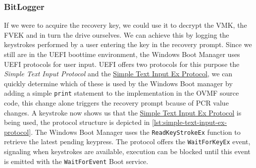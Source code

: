 \subsubsection{BitLogger}

If we were to acquire the recovery key, we could use it to decrypt the \ac{VMK}, the \ac{FVEK} and in turn the drive ourselves.
We can achieve this by logging the keystrokes performed by a user entering the key in the recovery prompt.
Since we still are in the \ac{UEFI} boottime environment, the Windows Boot Manager uses \ac{UEFI} protocols for user input.
\ac{UEFI} offers two protocols for this purpose the \emph{Simple Text Input Protocol} and the \hyperref[lst:simple-text-input-ex-protocol]{Simple Text Input Ex Protocol}, we can quickly determine which of these is used by the Windows Boot manager by adding a simple \lstinline{print} statement to the implementation in the \ac{OVMF} source code, this change alone triggers the recovery prompt bcause of \ac{PCR} value changes.
A keystroke now shows us that the \hyperref[lst:simple-text-input-ex-protocol]{Simple Text Input Ex Protocol} is being used, the protocol structure is depicted in \autoref{lst:simple-text-input-ex-protocol}.
The Windows Boot Manager uses the \lstinline{ReadKeyStrokeEx} function to retrieve the latest pending keypress.
The protocol offers the \lstinline{WaitForKeyEx} event, signaling when keystrokes are available, execution can be blocked until this event is emitted with the \lstinline{WaitForEvent} Boot service.


